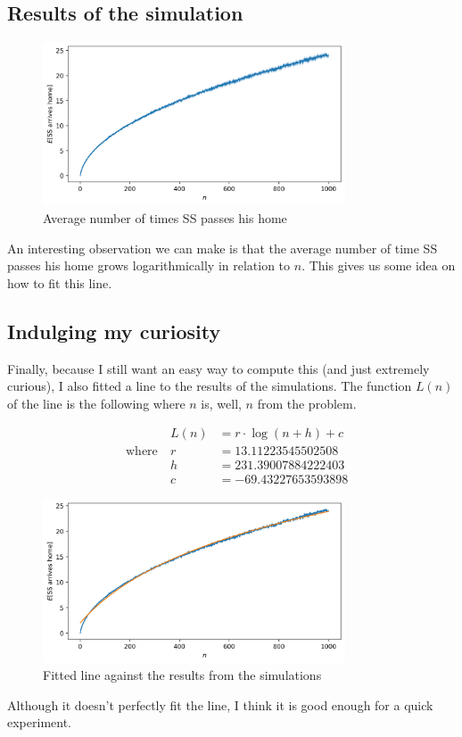 \newpage

\subsection*{Results of the simulation}

\begin{figure}[h]
	\centering
	\includegraphics[width=0.8\textwidth]{graphics/02-arriveshome.png}
	\caption{Average number of times SS passes his home}
\end{figure}

An interesting observation we can make is that the average number of time SS passes his home grows logarithmically in relation to $n$.
This gives us some idea on how to fit this line.

\subsection*{Indulging my curiosity}

Finally, because I still want an easy way to compute this (and just extremely curious), I also fitted a line to the results of the simulations.
The function $L(n)$ of the line is the following where $n$ is, well, $n$ from the problem.

\begin{equation}
\begin{aligned}
	&& L(n) &= r \cdot \log(n + h) + c \\
	&\text{where}\ & r &= 13.11223545502508 \\
	&& h &= 231.39007884222403 \\
	&& c &= -69.43227653593898
\end{aligned}
\end{equation}

\begin{figure}[h]
	\centering
	\includegraphics[width=0.8\textwidth]{graphics/02-fittedline.png}
	\caption{Fitted line against the results from the simulations}
\end{figure}

Although it doesn't perfectly fit the line, I think it is good enough for a quick experiment.
